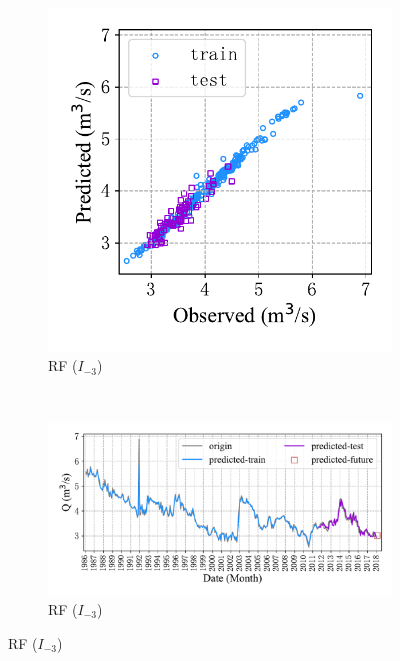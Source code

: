 \begin{figure}[!htbp]
\begin{subfigure}[b]{0.615\textwidth}
  \end{subfigure}
  \\
  \begin{subfigure}[b]{0.305\textwidth}
    \includegraphics[width=\textwidth]{Img/chap4_spr/out1/spr_scatter_in_3_out_1_rf.pdf}
    \vspace{-1.2cm}
    \caption{RF ($I_{-3}$)}
    \label{fig:spr_scatter_in_3_out_1_rf}
  \end{subfigure}
  ~
  \begin{subfigure}[b]{0.615\textwidth}
    \includegraphics[width=\textwidth]{Img/chap4_spr/out1/spr_series_in_3_out_1_rf.pdf}
    \vspace{-1.2cm}
    \caption{RF ($I_{-3}$)}
    \label{fig:spr_series_in_3_out_1_rf}

\end{subfigure}
\end{figure}
